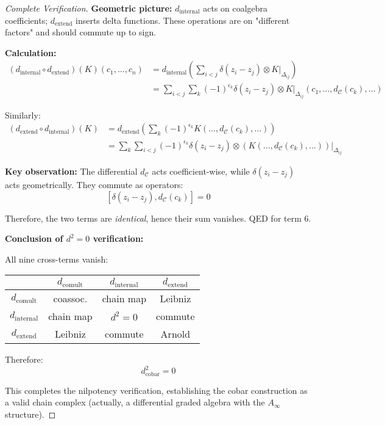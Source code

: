 \begin{proof}[Complete Verification]
\textbf{Geometric picture:} $d_{\text{internal}}$ acts on coalgebra coefficients; 
$d_{\text{extend}}$ inserts delta functions. These operations are on "different 
factors" and should commute up to sign.

\textbf{Calculation:}
\begin{align*}
(d_{\text{internal}} \circ d_{\text{extend}})(K)(c_1, \ldots, c_n) &= 
d_{\text{internal}}\left(\sum_{i<j} \delta(z_i - z_j) \otimes K|_{\Delta_{ij}}\right) \\
&= \sum_{i<j} \sum_k (-1)^{\epsilon_k} \delta(z_i - z_j) \otimes 
K|_{\Delta_{ij}}(c_1, \ldots, d_{\mathcal{C}}(c_k), \ldots)
\end{align*}

Similarly:
\begin{align*}
(d_{\text{extend}} \circ d_{\text{internal}})(K) &= d_{\text{extend}}\left(\sum_k 
(-1)^{\epsilon_k} K(\ldots, d_{\mathcal{C}}(c_k), \ldots)\right) \\
&= \sum_k \sum_{i<j} (-1)^{\epsilon_k} \delta(z_i - z_j) \otimes 
(K(\ldots, d_{\mathcal{C}}(c_k), \ldots))|_{\Delta_{ij}}
\end{align*}

\textbf{Key observation:} The differential $d_{\mathcal{C}}$ acts coefficient-wise, 
while $\delta(z_i - z_j)$ acts geometrically. They commute as operators:
$$[\delta(z_i - z_j), d_{\mathcal{C}}(c_k)] = 0$$

Therefore, the two terms are \emph{identical}, hence their sum vanishes. QED for term 6.

\textbf{Conclusion of $d^2 = 0$ verification:}

All nine cross-terms vanish:
\begin{center}
\begin{tabular}{c|ccc}
& $d_{\text{comult}}$ & $d_{\text{internal}}$ & $d_{\text{extend}}$ \\ \hline
$d_{\text{comult}}$ & coassoc. & chain map & Leibniz \\
$d_{\text{internal}}$ & chain map & $d^2=0$ & commute \\
$d_{\text{extend}}$ & Leibniz & commute & Arnold \\
\end{tabular}
\end{center}

Therefore:
$$\boxed{d_{\text{cobar}}^2 = 0}$$

This completes the nilpotency verification, establishing the cobar construction 
as a valid chain complex (actually, a differential graded algebra with the 
$A_\infty$ structure).
\end{proof}

